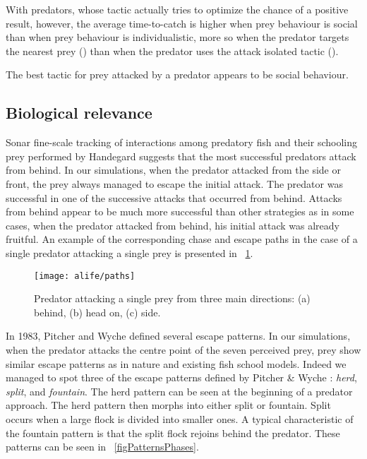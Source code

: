 With predators, whose tactic actually tries to optimize the chance of a positive result, however, the average time-to-catch is higher when prey behaviour is social than when prey behaviour is individualistic, more so when the predator targets the nearest prey () than when the predator uses the attack isolated tactic ().

The best tactic for prey attacked by a predator appears to be social behaviour.

\subsection{Biological relevance}

Sonar fine-scale tracking of interactions among predatory fish and their schooling prey performed by Handegard\etal \cite{handegard2012dynamics} suggests that the most successful predators attack from behind. In our simulations, when the predator attacked from the side or front, the prey always managed to escape the initial attack. The predator was successful in one of the successive attacks that occurred from behind. Attacks from behind appear to be much more successful than other strategies as in some cases, when the predator attacked from behind, his initial attack was already fruitful. An example of the corresponding chase and escape paths in the case of a single predator attacking a single prey is presented in \figurename~\ref{figPaths}.

\begin{figure}
  \texttt{[image: alife/paths]}
  \caption{Predator attacking a single prey from three main directions: (a) behind, (b) head on, (c) side.}
  \label{figPaths}
\end{figure}

In 1983, Pitcher and Wyche \cite{pitcher1983predator} defined several escape patterns. In our simulations, when the predator attacks the centre point of the seven perceived prey, prey show similar escape patterns as in nature and existing fish school models. Indeed we managed to spot three of the escape patterns defined by Pitcher \& Wyche \cite{pitcher1983predator}: \emph{herd}, \emph{split}, and \emph{fountain}. The herd pattern can be seen at the beginning of a predator approach. The herd pattern then morphs into either split or fountain. Split occurs when a large flock is divided into smaller ones. A typical characteristic of the fountain pattern is that the split flock rejoins behind the predator. These patterns can be seen in \figurename~\ref{figPatternsPhases}.

